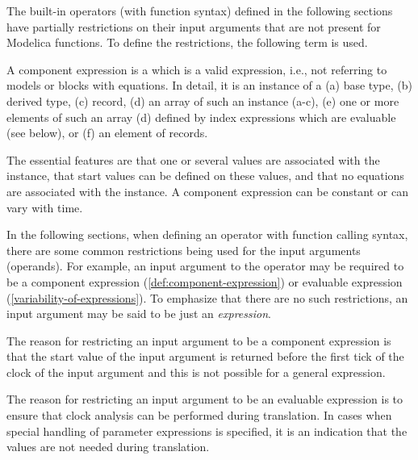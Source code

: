 The built-in operators (with function syntax) defined in the following sections have partially restrictions on their input arguments that are not present for Modelica functions.
To define the restrictions, the following term is used.

\begin{definition}\label{def:component-expression}
A component expression is a  which is a valid expression, i.e., not referring to models or blocks with equations.
In detail, it is an instance of a (a) base type, (b) derived type, (c) record, (d) an array of such an instance (a-c), (e) one or more elements of such an array (d) defined by index expressions which are evaluable (see below), or (f) an element of records.
\begin{nonnormative}
The essential features are that one or several values are associated with the instance, that start values can be defined on these values, and that no equations are associated with the instance.
A component expression can be constant or can vary with time.
\end{nonnormative}
\end{definition}

In the following sections, when defining an operator with function calling syntax, there are some common restrictions being used for the input arguments (operands).
For example, an input argument to the operator may be required to be a component expression (\cref{def:component-expression}) or evaluable expression (\cref{variability-of-expressions}).
To emphasize that there are no such restrictions, an input argument may be said to be just an \emph{expression}.

\begin{nonnormative}
The reason for restricting an input argument to be a component expression is that the start value of the input argument is returned before the first tick of the clock of the input argument and this is not possible for a general expression.

The reason for restricting an input argument to be an evaluable expression is to ensure that clock analysis can be performed during translation.
In cases when special handling of parameter expressions is specified, it is an indication that the values are not needed during translation.
\end{nonnormative}

